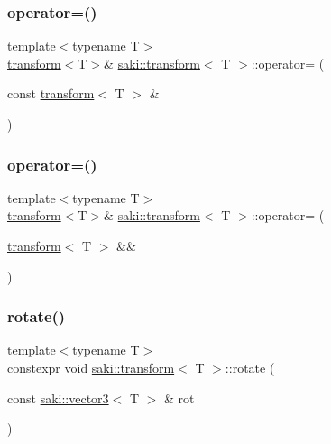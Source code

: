 \subsubsection{\texorpdfstring{operator=()}{operator=()}\hspace{0.1cm}{\footnotesize\ttfamily [1/2]}}
{\footnotesize\ttfamily template$<$typename T$>$ \\
\mbox{\hyperlink{classsaki_1_1transform}{transform}}$<$T$>$\& \mbox{\hyperlink{classsaki_1_1transform}{saki\+::transform}}$<$ T $>$\+::operator= (\begin{DoxyParamCaption}\item[{const \mbox{\hyperlink{classsaki_1_1transform}{transform}}$<$ T $>$ \&}]{ }\end{DoxyParamCaption})\hspace{0.3cm}{\ttfamily [default]}}

\mbox{\label{classsaki_1_1transform_aa43de25eaecdc6d713f83998247e9736}} 
\subsubsection{\texorpdfstring{operator=()}{operator=()}\hspace{0.1cm}{\footnotesize\ttfamily [2/2]}}
{\footnotesize\ttfamily template$<$typename T$>$ \\
\mbox{\hyperlink{classsaki_1_1transform}{transform}}$<$T$>$\& \mbox{\hyperlink{classsaki_1_1transform}{saki\+::transform}}$<$ T $>$\+::operator= (\begin{DoxyParamCaption}\item[{\mbox{\hyperlink{classsaki_1_1transform}{transform}}$<$ T $>$ \&\&}]{ }\end{DoxyParamCaption})\hspace{0.3cm}{\ttfamily [default]}}

\mbox{\label{classsaki_1_1transform_a34a7facf52587a38a40a7ff6643568cf}} 
\subsubsection{\texorpdfstring{rotate()}{rotate()}\hspace{0.1cm}{\footnotesize\ttfamily [1/2]}}
{\footnotesize\ttfamily template$<$typename T$>$ \\
constexpr void \mbox{\hyperlink{classsaki_1_1transform}{saki\+::transform}}$<$ T $>$\+::rotate (\begin{DoxyParamCaption}\item[{const \mbox{\hyperlink{classsaki_1_1vector3}{saki\+::vector3}}$<$ T $>$ \&}]{rot }\end{DoxyParamCaption})\hspace{0.3cm}{\ttfamily [inline]}}



